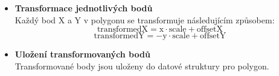 \begin{itemize}
    \item \textbf{Transformace jednotlivých bodů} \\
    Každý bod X a Y v polygonu se transformuje následujícím způsobem:
    \begin{equation}
        \text{transformedX} = \text{x} \cdot \text{scale} + \text{offsetX}
    \end{equation}
    \begin{equation}
        \text{transformedY} = -\text{y} \cdot \text{scale} + \text{offsetY}
    \end{equation}
    
    \item \textbf{Uložení transformovaných bodů} \\
    Transformované body jsou uloženy do datové struktury pro polygon.
\end{itemize}